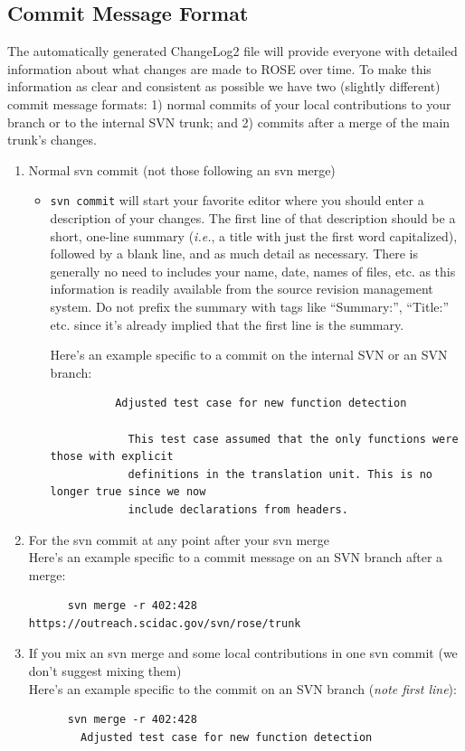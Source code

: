   \subsection{Commit Message Format}
  \label{CommitMessageFormat}
  The automatically generated ChangeLog2 file will provide everyone with
    detailed information about what changes are made to ROSE over time. To
    make this information as clear and consistent as possible we have two
    (slightly different) commit message formats:
    1) normal commits of your local contributions to your branch or to 
    the internal SVN trunk; and
    2) commits after a merge of the main trunk's changes.
    \begin{enumerate}
  \item Normal svn commit (not those following an svn merge)
    \begin{itemize}
  \item {\tt svn commit} will start your favorite editor where you should enter a
    description of your changes. The first line of that description should be
    a short, one-line summary ({\it i.e.}, a title with just the first word capitalized),
      followed by a blank line, and as much detail as necessary. There is generally
        no need to includes your name, date, names of files, etc. as this information
        is readily available from the source revision management system. Do not prefix
        the summary with tags like ``Summary:'', ``Title:'' etc. since it's already
        implied that the first line is the summary.

        Here's an example specific to a commit on the internal SVN or an SVN branch:
        {\indent
          \begin{verbatim}
          Adjusted test case for new function detection

            This test case assumed that the only functions were those with explicit
            definitions in the translation unit. This is no longer true since we now
            include declarations from headers.
            \end{verbatim} 
        }
  \end{itemize}
  \item For the svn commit at any point after your svn merge \\
    Here's an example specific to a commit message on an SVN branch after a merge:
    {\indent
      \begin{verbatim}
      svn merge -r 402:428 https://outreach.scidac.gov/svn/rose/trunk
        \end{verbatim} 
    }
  \item If you mix an svn merge and some local contributions in one svn
    commit (we don't suggest mixing them)\\
    Here's an example specific to the commit on an SVN branch ({\em note first line}):
    {\indent
      \begin{verbatim}
      svn merge -r 402:428
        Adjusted test case for new function detection


\end{verbatim}}
\end{enumerate}
